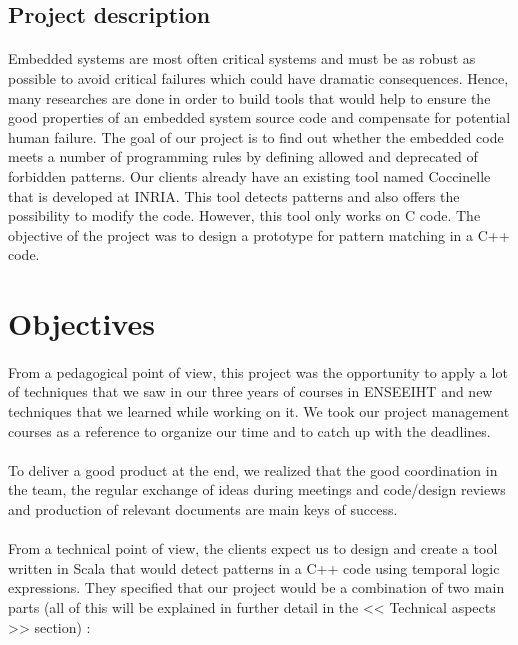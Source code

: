 \documentclass{report}
\begin{document}
\subsection{Project description}

\paragraph{}
\hspace{4mm}Embedded systems are most often critical systems and must be as robust as possible to avoid critical failures which could have dramatic consequences.
Hence, many researches are done in order to build tools that would help to ensure the good properties of an embedded system source code and compensate for potential human
failure. The goal of our project is to find out whether the embedded 
code meets a number of programming rules by defining allowed
 and deprecated of forbidden patterns. Our clients already have an existing tool named 
Coccinelle that is developed at INRIA. This tool detects patterns 
and also offers the possibility to modify the code. However, this 
tool only works on C code. The objective of the project was to design 
a prototype for pattern matching in a C++ code.

\section{Objectives}

\paragraph{}
\hspace{4mm}From a pedagogical point of view, this project was the 
opportunity to apply a lot of techniques that we saw in our three 
years of courses in ENSEEIHT and new techniques that we learned
while working on it. We took our project management courses as a reference to 
organize our time and to catch up with the deadlines.

\paragraph{}
\hspace{4mm}To deliver a good product at the end, we realized that the good coordination
in the team, the regular exchange of ideas during meetings and code/design reviews
and production of relevant documents are main keys of success.

\paragraph{}
\hspace{4mm}From a technical point of view, the clients expect us to design and create 
a tool written in Scala that would detect patterns in a C++ code
 using temporal logic expressions. They specified that our project 
would be a combination of two main parts (all of this will be explained in further detail in the << Technical aspects >> section) :
\end{document}

